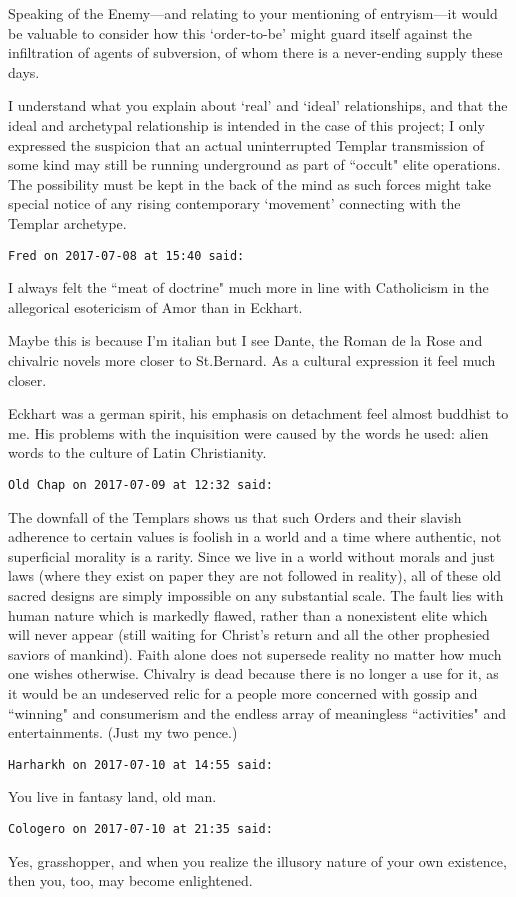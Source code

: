 \begin{footnotesize}
\begin{sffamily}
Speaking of the Enemy—and relating to your mentioning of entryism—it would be valuable to consider how this `order-to-be' might guard itself against the infiltration of agents of subversion, of whom there is a never-ending supply these days. 

I understand what you explain about `real' and `ideal' relationships, and that the ideal and archetypal relationship is intended in the case of this project; I only expressed the suspicion that an actual uninterrupted Templar transmission of some kind may still be running underground as part of ``occult" elite operations. The possibility must be kept in the back of the mind as such forces might take special notice of any rising contemporary `movement' connecting with the Templar archetype.


\hfill

\texttt{Fred on 2017-07-08 at 15:40 said: }

I always felt the ``meat of doctrine" much more in line with Catholicism in the allegorical esotericism of Amor than in Eckhart.

Maybe this is because I'm italian but I see Dante, the Roman de la Rose and chivalric novels more closer to St.Bernard. As a cultural expression it feel much closer.

Eckhart was a german spirit, his emphasis on detachment feel almost buddhist to me. His problems with the inquisition were caused by the words he used: alien words to the culture of Latin Christianity.


\hfill

\texttt{Old Chap on 2017-07-09 at 12:32 said: }

The downfall of the Templars shows us that such Orders and their slavish adherence to certain values is foolish in a world and a time where authentic, not superficial morality is a rarity. Since we live in a world without morals and just laws (where they exist on paper they are not followed in reality), all of these old sacred designs are simply impossible on any substantial scale. The fault lies with human nature which is markedly flawed, rather than a nonexistent elite which will never appear (still waiting for Christ's return and all the other prophesied saviors of mankind). Faith alone does not supersede reality no matter how much one wishes otherwise. Chivalry is dead because there is no longer a use for it, as it would be an undeserved relic for a people more concerned with gossip and ``winning" and consumerism and the endless array of meaningless ``activities" and entertainments. (Just my two pence.)


\hfill

\texttt{Harharkh on 2017-07-10 at 14:55 said: }

You live in fantasy land, old man.


\hfill

\texttt{Cologero on 2017-07-10 at 21:35 said: }

Yes, grasshopper, and when you realize the illusory nature of your own existence, then you, too, may become enlightened.


\hfill


\end{sffamily}\end{footnotesize}

